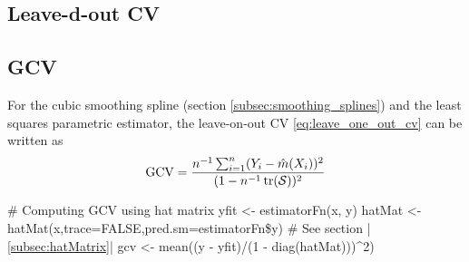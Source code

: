 \subsection{Leave-d-out CV}

\subsection{GCV}
\begin{theory}
 For the cubic smoothing spline (section \ref{subsec:smoothing_splines}) and the least squares parametric estimator,
 the leave-on-out CV \eqref{eq:leave_one_out_cv} can be written as
\begin{equation*}
 \text{GCV} = \frac{n^{-1}\sum_{i=1}^n(Y_i - \hat{m}(X_i))^2}{(1-n^{-1} \operatorname{tr}(\mathcal{S}))^2}
\end{equation*}
\end{theory}

\begin{code}
 # Computing GCV using hat matrix
 yfit <- estimatorFn(x, y)
 hatMat <- hatMat(x,trace=FALSE,pred.sm=estimatorFn\$y) # See section |\ref{subsec:hatMatrix}|
 gcv <- mean((y - yfit)/(1 - diag(hatMat)))^2)
\end{code}
